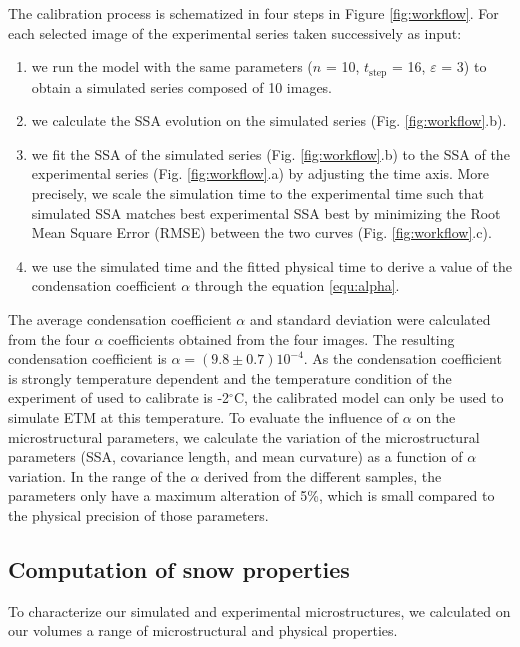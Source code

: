 \documentclass[draft,ms]{agujournal2019}
\begin{document}
The calibration process is schematized in four steps in Figure \ref{fig:workflow}. For each selected image of the experimental series taken successively as input:
\begin{enumerate}
    \item we run the model with the same parameters ($n$ = 10, $t_{\mathrm{step}}$ = 16, $\varepsilon$ = 3) to obtain a simulated series composed of 10 images. 
    \item we calculate the SSA evolution on the simulated series (Fig. \ref{fig:workflow}.b).
    \item we fit the SSA of the simulated series (Fig. \ref{fig:workflow}.b) to the SSA of the experimental series (Fig. \ref{fig:workflow}.a) by adjusting the time axis. More precisely, we scale the simulation time to the experimental time such that simulated SSA matches best experimental SSA best by minimizing the Root Mean Square Error (RMSE) between the two curves (Fig. \ref{fig:workflow}.c).   
    \item we use the simulated time and the fitted physical time to derive a value of the condensation coefficient $\alpha$ through the equation \eqref{equ:alpha}. 
\end{enumerate}

The average condensation coefficient $\alpha$ and standard deviation were calculated from the four $\alpha$ coefficients obtained from the four images. The resulting condensation coefficient is $\alpha = ( 9.8 \pm 0.7) 10^{-4}$. As the condensation coefficient is strongly temperature dependent and the temperature condition of the experiment of  used to calibrate is -2$^\circ$C, the calibrated model can only be used to simulate ETM at this temperature. To evaluate the influence of $\alpha$ on the microstructural parameters, we calculate the variation of the microstructural parameters (SSA, covariance length, and mean curvature) as a function of $\alpha$ variation. In the range of the $\alpha$ derived from the different samples, the parameters only have a maximum alteration of 5\%, which is small compared to the physical precision of those parameters. 

\subsection{Computation of snow properties}
\label{subsec:methode_physical_appli}

To characterize our simulated and experimental microstructures, we calculated on our volumes a range of microstructural and physical properties.
\end{document}
